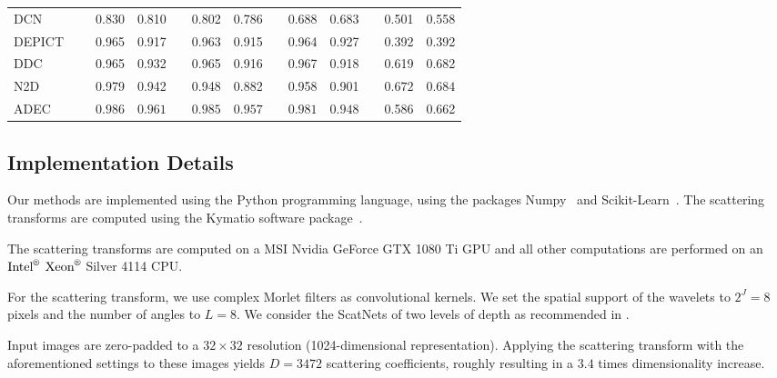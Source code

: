 \documentclass[11pt]{article}
\theoremstyle{definition}
\begin{document}
\begin{table*}[t]
\begin{adjustbox}{width=0.99\textwidth}
\begin{tabular}{lr|llrllrllrll}
			DCN~\cite{Yang_TowrdsKMeansFriendlySpacesDeepClustering_2017}
			&& 0.830 & 0.810 && 0.802 & 0.786 
			&& 0.688 & 0.683 && 0.501 & 0.558 \\
			
			DEPICT~\cite{Ghasedi_DEPICTDeepClusteringJointConvolutionalAutoencoderAndRelativeEntropyMinimization_2017} 	
			&& 0.965& 0.917&& 0.963& 0.915
			&& 0.964& 0.927&& 0.392& 0.392\\
			
			
			DDC~\cite{Ren_DeepDensityBasedClustering_2020}
			&& 0.965& 0.932&& 0.965& 0.916
			&& 0.967& 0.918&& 0.619& 0.682\\
			
			N2D~\cite{Mcconville_DeepClusteringManifoldAutoencodedEmbedding_2019}
			&& 0.979& 0.942&& 0.948& 0.882
			&& 0.958& 0.901&& $\mathbf{0.672}$& $\mathbf{0.684}$\\
			
			ADEC~\cite{Mrabah_AdversarialDeepEmbeddedClustering_2020}
			&& $\mathbf{0.986}$& $\mathbf{0.961}$&& $\mathbf{0.985}$& $\mathbf{0.957}$
			&& $\mathbf{0.981}$& $\mathbf{0.948}$&& 0.586& 0.662\\
			
			\hline
		\end{tabular}
	\end{adjustbox}
\end{table*}


\subsection{Implementation Details}

Our methods are implemented using the Python programming language, using the packages Numpy~\cite{Harris_Numpy_2020} and Scikit-Learn~\cite{Pedregosa_ScikitLearn_201}. The scattering transforms are computed using the Kymatio software package~\cite{Andreux_Kimatio_2018}.

The scattering transforms are computed on a MSI Nvidia GeForce GTX 1080 Ti GPU and all other computations are performed on an
$\text{Intel}^{\text{\textregistered}}$ $\text{Xeon}^{\text{\textregistered}}$ Silver 4114 CPU.

For the scattering transform, we use complex Morlet filters as convolutional kernels. We set the spatial support of the wavelets to $2^J = 8$ pixels and the number of angles to $L=8$. We consider the ScatNets of two levels of depth as recommended in \cite{Bruna_InvariantScattering_2012}.

Input images are zero-padded to a $32 \times 32$ resolution (1024-dimensional representation). Applying the scattering transform with the aforementioned settings to these images yields $D=3472$ scattering coefficients, roughly resulting in a $3.4$ times dimensionality increase.
\end{document}
